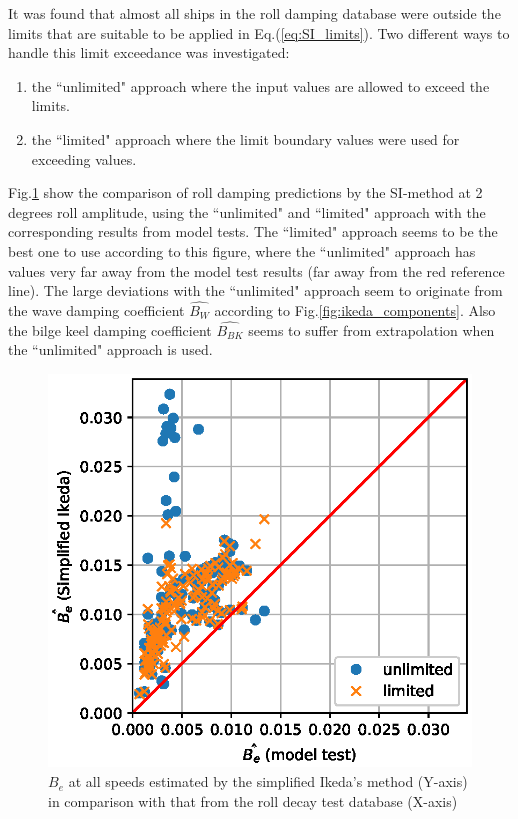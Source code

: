 It was found that almost all ships in the roll damping database were outside the limits that are suitable to be applied in Eq.(\ref{eq:SI_limits}). Two different ways to handle this limit exceedance was investigated:
\begin{enumerate}
  \item the ``unlimited" approach where the input values are allowed to exceed the limits.
  \item the ``limited" approach where the limit boundary values were used for exceeding values.
\end{enumerate}

Fig.\ref{fig:ikeda_limited} show the comparison of roll damping predictions by the SI-method at 2 degrees roll amplitude, using the ``unlimited" and ``limited" approach with the corresponding results from model tests. The ``limited" approach seems to be the best one to use according to this figure, where the ``unlimited" approach has values very far away from the model test results (far away from the red reference line).   
The large deviations with the ``unlimited" approach seem to originate from the wave damping coefficient $\hat{B_W}$ according to Fig.\ref{fig:ikeda_components}. Also the bilge keel damping coefficient $\hat{B_{BK}}$ seems to suffer from extrapolation when the ``unlimited" approach is used. 

\begin{figure}[H]
\vspace{-0.5cm}
\centering
  \centering
  \includegraphics[]{figures/ikeda_limited.eps}
  \vspace{-0.5cm}
  \caption{$\hat{B_e}$ at all speeds estimated by the simplified Ikeda's method (Y-axis) in comparison with that from the roll decay test database (X-axis)}
  \label{fig:ikeda_limited}
\end{figure}
